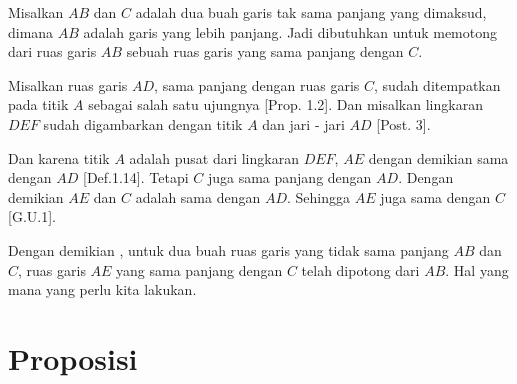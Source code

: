 \documentclass[a4paper]{book}
\begin{document}
\begin{center}
\end{center}

Misalkan $AB$ dan $C$ adalah dua buah garis tak sama panjang yang dimaksud,
dimana $AB$ adalah garis yang lebih panjang. Jadi dibutuhkan untuk memotong
dari ruas garis $AB$ sebuah ruas garis yang sama panjang dengan $C$.

Misalkan ruas garis $AD$, sama panjang dengan ruas garis $C$, sudah ditempatkan
pada titik $A$ sebagai salah satu ujungnya [Prop. 1.2]. Dan misalkan lingkaran
$DEF$ sudah digambarkan dengan titik $A$ dan jari - jari $AD$ [Post. 3].

Dan karena titik $A$ adalah pusat dari lingkaran $DEF$, $AE$ dengan demikian
sama dengan $AD$ [Def.1.14]. Tetapi $C$ juga sama panjang dengan $AD$. Dengan 
demikian $AE$ dan $C$ adalah sama dengan $AD$. Sehingga $AE$ juga sama dengan
$C$ [G.U.1].

Dengan demikian , untuk dua buah ruas garis yang tidak sama panjang $AB$ 
dan $C$, ruas garis $AE$ yang sama panjang dengan $C$ telah dipotong dari 
$AB$. Hal yang mana yang perlu kita lakukan.

\section*{\centering Proposisi \thesection} 
\end{document}
